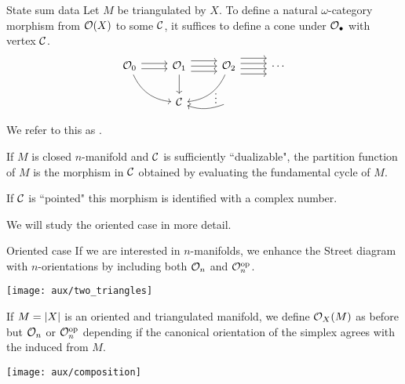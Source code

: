 \begin{frame}[fragile]{State sum data}
	\pause
	Let $M$ be triangulated by $X$.
	To define a natural $\omega$-category morphism from $\mathcal{O}(X)$ to some $\mathcal{C}$, it suffices to define a cone under $\mathcal{O}_\bullet$ with vertex $\mathcal{C}$.
	\[
	\begin{tikzcd}
		\cO_0 \arrow[dr, bend right] \arrow[r,shift left=1] \arrow[r,shift right=1] &
		\cO_1 \dar \arrow[r,shift left=2] \arrow[r,shift right=2] \rar &
		\cO_2 \arrow[dl, bend left] \arrow[r,shift left=1] \arrow[r,shift right=1] \arrow[r,shift left=3] \arrow[r,shift right=3] & \cdots \\
		& \cC & \arrow[l,"\vdots"',pos=0.1, in=-20, out=200] &
	\end{tikzcd}
	\]

	\pause\medskip
	We refer to this as .

	\pause\medskip
	If $M$ is closed $n$-manifold and $\mathcal{C}$ is sufficiently ``dualizable", the partition function of $M$  is the morphism in $\mathcal{C}$ obtained by evaluating the fundamental cycle of $M$.

	\pause\medskip
	If $\mathcal{C}$ is ``pointed" this morphism is identified with a complex number.

	\pause\medskip
	We will study the oriented case in more detail.
\end{frame}

\begin{frame}{Oriented case}
	\pause
	If we are interested in $n$-manifolds, we enhance the Street diagram with $n$-orientations by including both $\mathcal{O}_n$ and $\mathcal{O}_n^{\mathrm{op}}$.

	\begin{center}
		\texttt{[image: aux/two\_triangles]}
	\end{center}

	\pause
	If $M = \lvert X\rvert$ is an oriented and triangulated manifold, we define $\mathcal{O}_X(M)$ as before but $\mathcal{O}_n$ or $\mathcal{O}_n^{\mathrm{op}}$ depending if the canonical orientation of the simplex agrees with the induced from $M$.

	\begin{center}
		\texttt{[image: aux/composition]}
	\end{center}
\end{frame}

